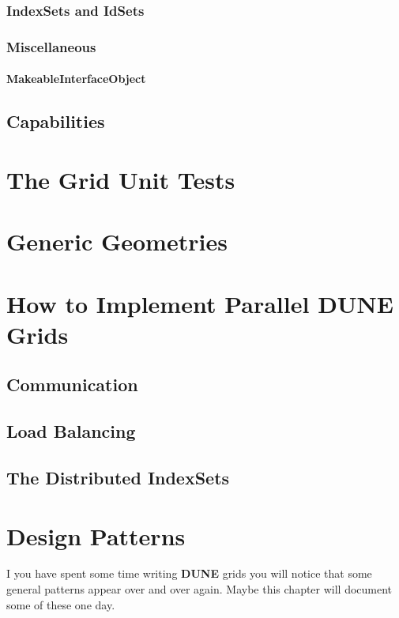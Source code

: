 \documentclass[11pt,a4paper,headinclude,footinclude,DIV16,normalheadings]{scrreprt}
\newcommand{\Dune}{{\sf\bfseries DUNE}\xspace}
\begin{document}
\subsection{IndexSets and IdSets}

\subsection{Miscellaneous}

\subsubsection{MakeableInterfaceObject}

\section{Capabilities}

\chapter{The Grid Unit Tests}

\chapter{Generic Geometries}

\chapter{How to Implement Parallel \Dune Grids}

\section{Communication}

\section{Load Balancing}

\section{The Distributed IndexSets}

\chapter{Design Patterns}

I you have spent some time writing \Dune grids you will notice that
some general patterns appear over and over again.  Maybe this chapter
will document some of these one day.




\printindex
\end{document}

